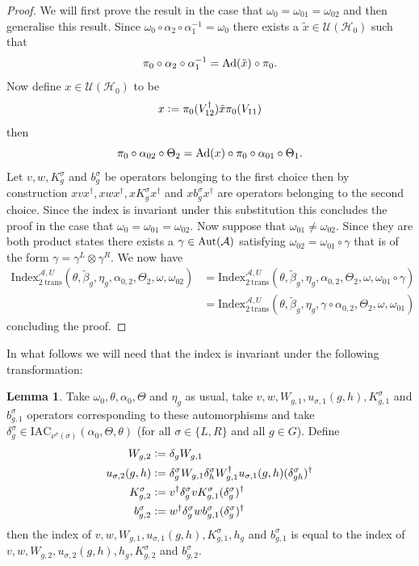 \documentclass[12pt,a4paper,twoside]{article}
\newcommand{\IAC}{\textrm{IAC}}
\newcommand{\defeq}{\vcentcolon=}
\let\originalleft\left
\let\originalright\right
\renewcommand{\left}{\mathopen{}\mathclose\bgroup\originalleft}
\renewcommand{\right}{\aftergroup\egroup\originalright}
\newcommand{\UU}{\mathcal U}
\newcommand{\HH}{\mathcal H}
\renewcommand{\AA}{\mathcal A}
\newcommand{\Ad}[1]{\textrm{Ad}\left(#1\right)}
\newcommand{\Aut}[1]{\textrm{Aut}\left(#1\right)}
\theoremstyle{definition}
\newtheorem{lemma}[theorem]{Lemma}
\numberwithin{equation}{section}
\begin{document}
\begin{proof}
	We will first prove the result in the case that $\omega_0=\omega_{01}=\omega_{02}$ and then generalise this result. Since $\omega_0\circ\alpha_2\circ\alpha_1^{-1}=\omega_0$ there exists a $\tilde{x}\in\UU(\HH_0)$ such that
	\begin{equation}
		\pi_0\circ\alpha_2\circ\alpha_1^{-1}=\Ad{\tilde{x}}\circ\pi_0.
	\end{equation}
	Now define $x\in\UU(\HH_0)$ to be
	\begin{equation}
		x\defeq \pi_0(V_{12}^\dagger)\tilde{x} \pi_0(V_{11})
	\end{equation}
	then
	\begin{equation}
		\pi_0\circ\alpha_{02}\circ\Theta_2=\Ad{x}\circ\pi_0\circ\alpha_{01}\circ\Theta_1.
	\end{equation}
	Let $v,w,K_g^\sigma$ and $b_g^\sigma$ be operators belonging to the first choice then by construction $xvx^\dagger,xwx^\dagger,xK_g^\sigma x^\dagger$ and $xb_g^\sigma x^\dagger$ are operators belonging to the second choice. Since the index is invariant under this substitution this concludes the proof in the case that $\omega_0=\omega_{01}=\omega_{02}$. Now suppose that $\omega_{01}\neq\omega_{02}$. Since they are both product states there exists a $\gamma\in\Aut{\AA}$ satisfying $\omega_{02}=\omega_{01}\circ\gamma$ that is of the form $\gamma=\gamma^L\otimes\gamma^R$. We now have
	\begin{align}
		\textrm{Index}_{2\:\text{trans}}^{\AA,U}(\theta,\tilde{\beta}_g,\eta_g,\alpha_{0,2},\Theta_2,\omega,\omega_{02})&=\textrm{Index}_{2\:\text{trans}}^{\AA,U}(\theta,\tilde{\beta}_g,\eta_g,\alpha_{0,2},\Theta_2,\omega,\omega_{01}\circ\gamma)\\
		&=\textrm{Index}_{2\:\text{trans}}^{\AA,U}(\theta,\tilde{\beta}_g,\eta_g,\gamma\circ\alpha_{0,2},\Theta_2,\omega,\omega_{01})
	\end{align}
	concluding the proof.
\end{proof}
In what follows we will need that the index is invariant under the following transformation:
\begin{lemma}\label{lem:TransformationUnderDeltaTwoTranslations}
	Take $\omega_0,\theta,\alpha_0,\Theta$ and $\eta_g$ as usual, take $v,w,W_{g,1},u_{\sigma,1}(g,h),K_{g,1}^\sigma$ and $b_{g,1}^\sigma$ operators corresponding to these automorphisms and take $\delta^\sigma_g\in\IAC_{\nu^\sigma(\sigma)}(\alpha_0,\Theta,\theta)$ (for all $\sigma\in\{L,R\}$ and all $g\in G$). Define
	\begin{align}
		W_{g,2}&\defeq\delta_g W_{g,1}\\
		u_{\sigma,2}(g,h)&\defeq \delta_g^\sigma W_{g,1}\delta_h^\sigma W_{g,1}^\dagger u_{\sigma,1}(g,h)(\delta_{gh}^\sigma)^\dagger\\
		K^\sigma_{g,2}&\defeq v^\dagger \delta_g^\sigma v K_{g,1}^\sigma (\delta_g^\sigma)^\dagger\\
		b_{g,2}^\sigma&\defeq w^\dagger\delta^\sigma_g w b_{g,1}^\sigma (\delta^\sigma_g)^\dagger
	\end{align}
	then the index of $v,w,W_{g,1},u_{\sigma,1}(g,h),K_{g,1}^\sigma,h_g$ and $b_{g,1}^\sigma$ is equal to the index of $v,w,W_{g,2},u_{\sigma,2}(g,h),h_g,K_{g,2}^\sigma$ and $b_{g,2}^\sigma$.
\end{lemma}
\end{document}
